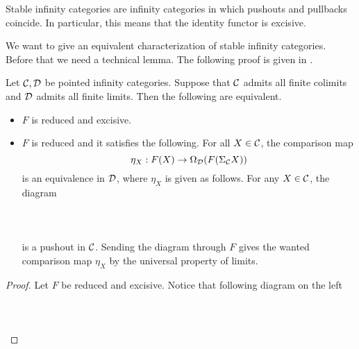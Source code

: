 Stable infinity categories are infinity categories in which pushouts and pullbacks coincide. In particular, this means that the identity functor is excisive. 

We want to give an equivalent characterization of stable infinity categories. Before that we need a technical lemma. The following proof is given in \cite{AHKT}. 

\begin{lmm}\label{lmm:RedExiffEquiv} Let $\mathcal{C},\mathcal{D}$ be pointed infinity categories. Suppose that $\mathcal{C}$ admits all finite colimits and $\mathcal{D}$ admits all finite limits. Then the following are equivalent. 
\begin{itemize}
\item $F$ is reduced and excisive. 
\item $F$ is reduced and it satisfies the following. For all $X\in\mathcal{C}$, the comparison map $$\eta_X:F(X)\to\Omega_{\mathcal{D}}(F(\Sigma_{\mathcal{C}} X))$$ is an equivalence in $\mathcal{D}$, where $\eta_X$ is given as follows. For any $X\in\mathcal{C}$, the diagram  
 \\~\\  \\~\\
is a pushout in $\mathcal{C}$. Sending the diagram through $F$ gives the wanted comparison map $\eta_X$ by the universal property of limits. 
\end{itemize} 
\begin{proof}
Let $F$ be reduced and excisive. Notice that following diagram on the left  
 \\~\\  \\~\\

\end{proof}
\end{lmm}
